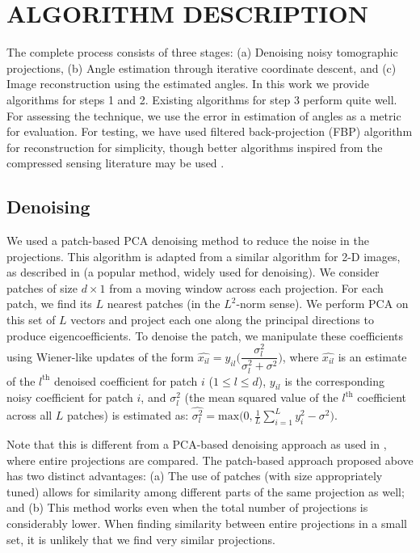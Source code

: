 \documentclass{article}
\begin{document}
\section{ALGORITHM DESCRIPTION}
\label{sec:algo}
The complete process consists of three stages: (a) Denoising noisy tomographic projections, (b) Angle estimation through iterative coordinate descent, and (c) Image reconstruction using the estimated angles. In this work we provide algorithms for steps 1 and 2. Existing algorithms for step 3 perform quite well. For assessing the technique, we use the error in estimation of angles as a metric for evaluation. For testing, we have used filtered back-projection (FBP) algorithm for reconstruction for simplicity, though better algorithms inspired from the compressed sensing literature may be used \cite{kim2008interior}. 

\subsection{Denoising}
\label{ssec:denoising}
We used a patch-based PCA denoising method to reduce the noise in the projections. This algorithm is adapted from a similar algorithm for 2-D images, as described in \cite{Muresan03} (a popular method, widely used for denoising). We consider patches of size $d \times 1$ from a moving window across each projection. For each patch, we find its $L$ nearest patches (in the $L^2$-norm sense). We perform PCA on this set of $L$ vectors and project each one along the principal directions to produce eigencoefficients. To denoise the patch, we manipulate these coefficients using Wiener-like updates of the form $\hat{x_{il}} = y_{il} \bigg(\dfrac{\sigma_l^2}{\sigma_l^2 + \sigma^2}\bigg)$, where $\hat{x_{il}}$ is an estimate of the $l^{\textrm{th}}$ denoised coefficient for patch $i$ ($1 \leq l \leq d$), $y_{il}$ is the corresponding noisy coefficient for patch $i$, and $\sigma_l^2$ (the mean squared value of the $l^{\textrm{th}}$ coefficient across all $L$ patches) is estimated as: $\hat{\sigma_l^2} = \textrm{max}\bigg(0,\frac{1}{L}\sum\limits_{i=1}^L  {y_i^2 - \sigma^2}\bigg)$. 

Note that this is different from a PCA-based denoising approach as used in \cite{singer2013}, where entire projections are compared. The patch-based approach proposed above has two distinct advantages: (a) The use of patches (with size appropriately tuned) allows for similarity among different parts of the same projection as well; and (b) This method works even when the total number of projections is considerably lower. When finding similarity between entire projections in a small set, it is unlikely that we find very similar projections.
\end{document}
